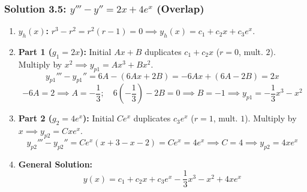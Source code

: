 \documentclass[11pt,letterpaper]{article}
\begin{document}
\subsubsection*{Solution 3.5: $y''' - y'' = 2x + 4e^x$ \quad (\textbf{Overlap})}
\begin{enumerate}
    \item \textbf{$y_h(x)$:} $r^3 - r^2 = r^2(r-1) = 0 \implies y_h(x) = c_1 + c_2 x + c_3 e^x$.
    \item \textbf{Part 1 ($g_1 = 2x$):} Initial $A x + B$ duplicates $c_1 + c_2 x$ ($r=0$, mult. $2$). Multiply by $x^2 \implies y_{p1} = A x^3 + B x^2$.
    \[ y_{p1}''' - y_{p1}'' = 6A - (6Ax + 2B) = -6Ax + (6A - 2B) = 2x \]
    \[ -6A = 2 \implies A = -\frac{1}{3}; \quad 6\left(-\frac{1}{3}\right) - 2B = 0 \implies B = -1 \implies y_{p1} = -\frac{1}{3}x^3 - x^2 \]
    \item \textbf{Part 2 ($g_2 = 4e^x$):} Initial $C e^x$ duplicates $c_3 e^x$ ($r=1$, mult. $1$). Multiply by $x \implies y_{p2} = C x e^x$.
    \[ y_{p2}''' - y_{p2}'' = C e^x (x + 3 - x - 2) = C e^x = 4e^x \implies C = 4 \implies y_{p2} = 4x e^x \]
    \item \textbf{General Solution:}
    \[ y(x) = c_1 + c_2 x + c_3 e^x - \frac{1}{3}x^3 - x^2 + 4x e^x \]
\end{enumerate}
\end{document}
